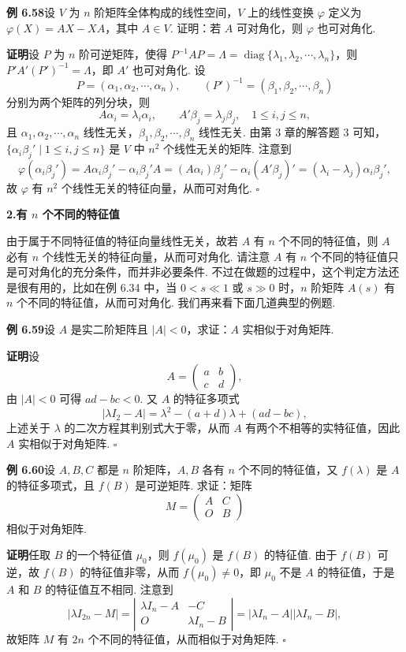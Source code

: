\documentclass[UTF8,12pt,a4paper,fontset=fandol]{ctexart}
\begin{document}
\noindent\textbf{例 6.58}\quad 设 $V$ 为 $n$ 阶矩阵全体构成的线性空间，$V$ 上的线性变换 $\varphi$ 定义为 $\varphi(X)=AX-XA$，其中 $A\in V$. 证明：若 $A$ 可对角化，则 $\varphi$ 也可对角化.

\noindent\textbf{证明}\quad 设 $P$ 为 $n$ 阶可逆矩阵，使得 $P^{-1}AP=\Lambda=\operatorname{diag}\{\lambda_1,\lambda_2,\cdots,\lambda_n\}$，则 $P'A'(P')^{-1}=\Lambda$，即 $A'$ 也可对角化. 设
\[
P=(\alpha_1,\alpha_2,\cdots,\alpha_n),\qquad (P')^{-1}=(\beta_1,\beta_2,\cdots,\beta_n)
\]
分别为两个矩阵的列分块，则
\[
A\alpha_i=\lambda_i\alpha_i,\qquad A'\beta_j=\lambda_j\beta_j,\quad 1\le i,j\le n,
\]
且 $\alpha_1,\alpha_2,\cdots,\alpha_n$ 线性无关，$\beta_1,\beta_2,\cdots,\beta_n$ 线性无关. 由第 3 章的解答题 3 可知，$\{\alpha_i\beta_j'\mid 1\le i,j\le n\}$ 是 $V$ 中 $n^2$ 个线性无关的矩阵. 注意到
\[
\varphi(\alpha_i\beta_j')=A\alpha_i\beta_j'-\alpha_i\beta_j'A=(A\alpha_i)\beta_j'-\alpha_i(A'\beta_j)'=(\lambda_i-\lambda_j)\alpha_i\beta_j',
\]
故 $\varphi$ 有 $n^2$ 个线性无关的特征向量，从而可对角化. $\square$

\noindent\textbf{2.\quad 有 $n$ 个不同的特征值}

由于属于不同特征值的特征向量线性无关，故若 $A$ 有 $n$ 个不同的特征值，则 $A$ 必有 $n$ 个线性无关的特征向量，从而可对角化. 请注意 $A$ 有 $n$ 个不同的特征值只是可对角化的充分条件，而并非必要条件. 不过在做题的过程中，这个判定方法还是很有用的，比如在例 6.34 中，当 $0<s\ll 1$ 或 $s\gg 0$ 时，$n$ 阶矩阵 $A(s)$ 有 $n$ 个不同的特征值，从而可对角化. 我们再来看下面几道典型的例题.

\noindent\textbf{例 6.59}\quad 设 $A$ 是实二阶矩阵且 $|A|<0$，求证：$A$ 实相似于对角矩阵.

\noindent\textbf{证明}\quad 设
\[
A=\left(\begin{array}{cc}
a & b\\
c & d
\end{array}\right),
\]
由 $|A|<0$ 可得 $ad-bc<0$. 又 $A$ 的特征多项式
\[
|\lambda I_2-A|=\lambda^2-(a+d)\lambda+(ad-bc),
\]
上述关于 $\lambda$ 的二次方程其判别式大于零，从而 $A$ 有两个不相等的实特征值，因此 $A$ 实相似于对角矩阵. $\square$

\noindent\textbf{例 6.60}\quad 设 $A,B,C$ 都是 $n$ 阶矩阵，$A,B$ 各有 $n$ 个不同的特征值，又 $f(\lambda)$ 是 $A$ 的特征多项式，且 $f(B)$ 是可逆矩阵. 求证：矩阵
\[
M=\left(\begin{array}{cc}
A & C\\
O & B
\end{array}\right)
\]
相似于对角矩阵.

\noindent\textbf{证明}\quad 任取 $B$ 的一个特征值 $\mu_0$，则 $f(\mu_0)$ 是 $f(B)$ 的特征值. 由于 $f(B)$ 可逆，故 $f(B)$ 的特征值非零，从而 $f(\mu_0)\ne 0$，即 $\mu_0$ 不是 $A$ 的特征值，于是 $A$ 和 $B$ 的特征值互不相同. 注意到
\[
|\lambda I_{2n}-M|
=\left|\begin{array}{cc}
\lambda I_n-A & -C\\
O & \lambda I_n-B
\end{array}\right|
=|\lambda I_n-A||\lambda I_n-B|,
\]
故矩阵 $M$ 有 $2n$ 个不同的特征值，从而相似于对角矩阵. $\square$
\end{document}
